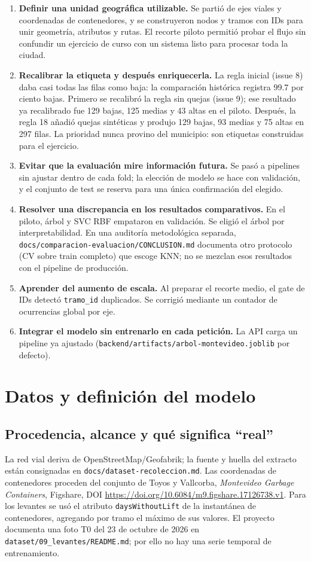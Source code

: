 \documentclass[11pt,a4paper]{article}
\begin{document}
\begin{enumerate}[leftmargin=*]
\item \textbf{Definir una unidad geográfica utilizable.} Se partió de ejes viales y coordenadas de contenedores, y se construyeron nodos y tramos con IDs para unir geometría, atributos y rutas. El recorte piloto permitió probar el flujo sin confundir un ejercicio de curso con un sistema listo para procesar toda la ciudad.
\item \textbf{Recalibrar la etiqueta y después enriquecerla.} La regla inicial (issue 8) daba casi todas las filas como baja: la comparación histórica registra 99.7 por ciento bajas. Primero se recalibró la regla sin quejas (issue 9); ese resultado ya recalibrado fue 129 bajas, 125 medias y 43 altas en el piloto. Después, la regla 18 añadió quejas sintéticas y produjo 129 bajas, 93 medias y 75 altas en 297 filas. La prioridad nunca provino del municipio: son etiquetas construidas para el ejercicio.
\item \textbf{Evitar que la evaluación mire información futura.} Se pasó a pipelines sin ajustar dentro de cada fold; la elección de modelo se hace con validación, y el conjunto de test se reserva para una única confirmación del elegido.
\item \textbf{Resolver una discrepancia en los resultados comparativos.} En el piloto, árbol y SVC RBF empataron en validación. Se eligió el árbol por interpretabilidad. En una auditoría metodológica separada, \texttt{docs/comparacion-evaluacion/CONCLUSION.md} documenta otro protocolo (CV sobre train completo) que escoge KNN; no se mezclan esos resultados con el pipeline de producción.
\item \textbf{Aprender del aumento de escala.} Al preparar el recorte medio, el gate de IDs detectó \texttt{tramo\_id} duplicados. Se corrigió mediante un contador de ocurrencias global por eje.
\item \textbf{Integrar el modelo sin entrenarlo en cada petición.} La API carga un pipeline ya ajustado (\texttt{backend/artifacts/arbol-montevideo.joblib} por defecto). 
\end{enumerate}

\section{Datos y definición del modelo}

\subsection{Procedencia, alcance y qué significa ``real''}
La red vial deriva de OpenStreetMap/Geofabrik; la fuente y huella del extracto están consignadas en \texttt{docs/dataset-recoleccion.md}. Las coordenadas de contenedores proceden del conjunto de Toyos y Vallcorba, \emph{Montevideo Garbage Containers}, Figshare, DOI \url{https://doi.org/10.6084/m9.figshare.17126738.v1}. Para los levantes se usó el atributo \texttt{daysWithoutLift} de la instantánea de contenedores, agregando por tramo el máximo de sus valores. El proyecto documenta una foto T0 del 23 de octubre de 2026 en \texttt{dataset/09\_levantes/README.md}; por ello no hay una serie temporal de entrenamiento.
\end{document}
